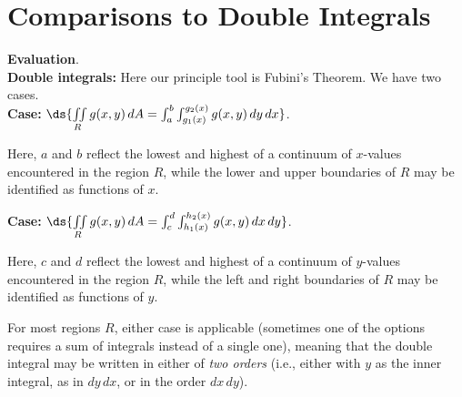 \documentclass[12pt,fleqn]{article}
\begin{document}
\section*{Comparisons to Double Integrals}
\be
\item {\bf Evaluation}.\\[8pt]
  {\bf Double integrals:}
  \bq
  Here our principle tool is Fubini's Theorem.  We have two cases.\\[8pt]
  {\bf Case:} $\ds{\iint\limits_R g(x,y)\,dA = \int_a^b \int_{g_1(x)}^{g_2(x)}
	g(x,y)\,dy \, dx}$.
  \bq
  \begin{minipage}[t]{5.5in}
	Here, $a$ and $b$ reflect the lowest and highest of a continuum of
	$x$-values encountered in the region $R$, while the lower and upper
	boundaries of $R$ may be identified as functions of $x$.
  \end{minipage}
  \eq
  {\bf Case:} $\ds{\iint\limits_R g(x,y)\,dA = \int_c^d \int_{h_1(x)}^{h_2(x)}
	g(x,y)\,dx \, dy}$.
  \bq
  \begin{minipage}[t]{5.5in}
	Here, $c$ and $d$ reflect the lowest and highest of a continuum of
	$y$-values encountered in the region $R$, while the left and right
	boundaries of $R$ may be identified as functions of $y$.
  \end{minipage}
  \eq
  \begin{minipage}[t]{5.9in}
  For most regions $R$, either case is applicable (sometimes one of
  the options requires a sum of integrals instead of a single one),
  meaning that the double integral may be written in either of
  {\em two orders} (i.e., either with $y$ as the inner integral, as
  in $dy\,dx$, or in the order $dx\,dy$).
  \end{minipage}
  \eq
\end{document}
